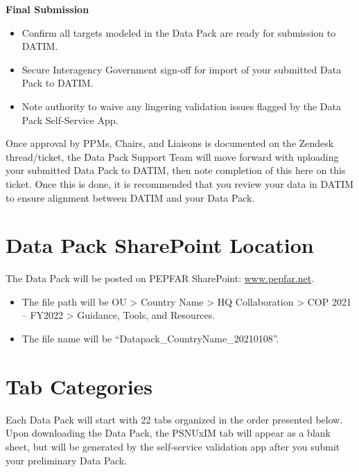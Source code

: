 \documentclass[
  openany]{book}
\begin{document}
\textbf{Final Submission}

\begin{itemize}
\item
  Confirm all targets modeled in the Data Pack are ready for submission
  to DATIM.
\item
  Secure Interagency Government sign-off for import of your submitted Data
  Pack to DATIM.
\item
  Note authority to waive any lingering validation issues flagged by the
  Data Pack Self-Service App.
\end{itemize}

Once approval by PPMs, Chairs, and Liaisons is documented on the Zendesk
thread/ticket, the Data Pack Support Team will move forward with uploading
your submitted Data Pack to DATIM, then note completion of this here on
this ticket. Once this is done, it is recommended that you review your data
in DATIM to ensure alignment between DATIM and your Data Pack.

\hypertarget{data-pack-sharepoint-location}{%
\section{Data Pack SharePoint Location}\label{data-pack-sharepoint-location}}

The Data Pack will be posted on PEPFAR SharePoint:
\href{http://www.pepfar.net}{www.pepfar.net}.

\begin{itemize}
\item
  The file path will be OU \textgreater{} Country Name \textgreater{} HQ Collaboration \textgreater{} COP
  2021 -- FY2022 \textgreater{} Guidance, Tools, and Resources.
\item
  The file name will be ``Datapack\_CountryName\_20210108''.
\end{itemize}

\hypertarget{tab-categories}{%
\section{Tab Categories}\label{tab-categories}}

Each Data Pack will start with 22 tabs organized in the order presented
below. Upon downloading the Data Pack, the PSNUxIM tab will appear as a
blank sheet, but will be generated by the self-service validation app
after you submit your preliminary Data Pack.
\end{document}
